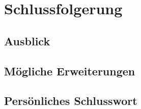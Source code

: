 \chapter{Schlussfolgerung}



\section{Ausblick}
\section{Mögliche Erweiterungen}

\section{Persönliches Schlusswort}
%
%
%
